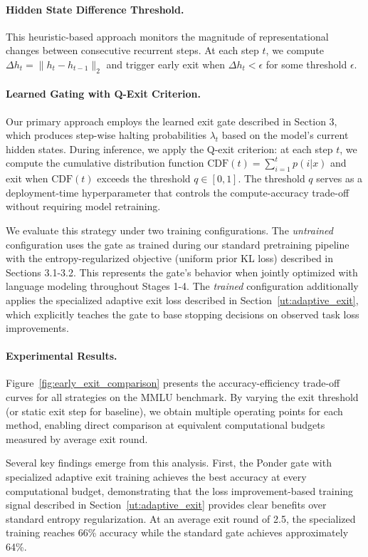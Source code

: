 \documentclass[]{bytedance_seed}
\newcommand{\1}{\mathbf{1}}
\begin{document}
\paragraph{Hidden State Difference Threshold.}
This heuristic-based approach monitors the magnitude of representational changes between consecutive recurrent steps. At each step $t$, we compute $\Delta h_t = \|h_t - h_{t-1}\|_2$ and trigger early exit when $\Delta h_t < \epsilon$ for some threshold $\epsilon$. 


\paragraph{Learned Gating with Q-Exit Criterion.}
Our primary approach employs the learned exit gate described in Section 3, which produces step-wise halting probabilities $\lambda_t$ based on the model's current hidden states. During inference, we apply the Q-exit criterion: at each step $t$, we compute the cumulative distribution function $\text{CDF}(t) = \sum_{i=1}^{t} p(i|x)$ and exit when $\text{CDF}(t)$ exceeds the threshold $q \in [0,1]$. The threshold $q$ serves as a deployment-time hyperparameter that controls the compute-accuracy trade-off without requiring model retraining.

We evaluate this strategy under two training configurations. The \textit{untrained} configuration uses the gate as trained during our standard pretraining pipeline with the entropy-regularized objective (uniform prior KL loss) described in Sections 3.1-3.2. This represents the gate's behavior when jointly optimized with language modeling throughout Stages 1-4. The \textit{trained} configuration additionally applies the specialized adaptive exit loss described in Section~\ref{ut:adaptive_exit}, which explicitly teaches the gate to base stopping decisions on observed task loss improvements.



\paragraph{Experimental Results.}
Figure~\ref{fig:early_exit_comparison} presents the accuracy-efficiency trade-off curves for all strategies on the MMLU benchmark. By varying the exit threshold (or static exit step for baseline), we obtain multiple operating points for each method, enabling direct comparison at equivalent computational budgets measured by average exit round.

Several key findings emerge from this analysis. First, the Ponder gate with specialized adaptive exit training  achieves the best accuracy at every computational budget, demonstrating that the loss improvement-based training signal described in Section~\ref{ut:adaptive_exit} provides clear benefits over standard entropy regularization. At an average exit round of 2.5, the specialized training reaches 66\% accuracy while the standard gate achieves approximately 64\%.
\end{document}
